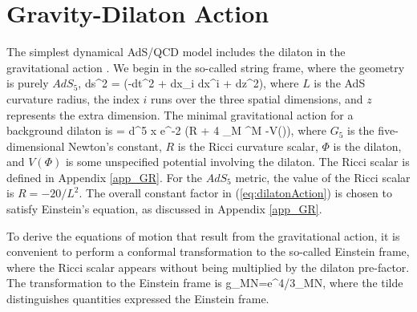 \section{Gravity-Dilaton Action}
\label{sec:gravity-dilaton}
The simplest dynamical AdS/QCD model includes the dilaton in the gravitational action \cite{DePaula2010,Wang2012,Csaki:2006ji}.
We begin in the so-called string frame, where the geometry is purely $AdS_5$, 
\be
ds^2 = (-dt^2 + dx_i dx^i + dz^2),
\label{eq:AdSmetricdynamical}
\ee
where $L$ is the AdS curvature radius, the index $i$ runs over the three spatial dimensions, and $z$ represents the extra dimension.
The minimal gravitational action for a background dilaton is
\be
{} = \int d^5 x \root e^{-2\Phi} \left(R + 4 \partial_M \Phi \partial^M \Phi -V(\Phi)\right),
\label{eq:dilatonAction}
\ee
where $G_5$ is the five-dimensional Newton's constant, $R$ is the Ricci curvature scalar, $\Phi$ is the dilaton, and $V(\Phi)$ is some unspecified potential involving the dilaton.
The Ricci scalar is defined in Appendix \ref{app_GR}. 
For the $AdS_5$ metric, the value of the Ricci scalar is $R=-20/L^2$.
The overall constant factor in (\ref{eq:dilatonAction}) is chosen to satisfy Einstein's equation, as discussed in Appendix \ref{app_GR}.

To derive the equations of motion that result from the gravitational action, it is convenient to perform a conformal transformation to the so-called Einstein frame, where the Ricci scalar appears without being multiplied by the dilaton pre-factor.
The transformation to the Einstein frame is
\be
g_{MN}=e^{4\Phi/3}_{MN},
\label{eq:transform}
\ee
where the tilde distinguishes quantities expressed the Einstein frame. 

